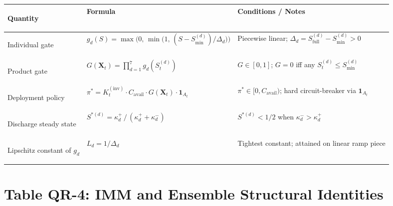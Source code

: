 \documentclass[12pt,openany]{book}
\numberwithin{equation}{chapter}
\theoremstyle{plain}
\theoremstyle{definition}
\theoremstyle{remark}
\renewcommand{\arraystretch}{1.2}
\def\mathcal#1{#1}%
\begin{document}
\begin{center}
\small
\renewcommand{\arraystretch}{1.40}
\begin{tabularx}{\linewidth}{@{}
  >{\bfseries\raggedright\arraybackslash}p{3.2cm}
  >{\raggedright\arraybackslash}p{4.6cm}
  >{\raggedright\arraybackslash}X
@{}}
\toprule
Quantity & Formula & Conditions / Notes \\
\midrule
Individual gate &
$g_d(\mathcal{S}) = \max\!\bigl(0,\,\min\!\bigl(1,\,(\mathcal{S}-\mathcal{S}_{\min}^{(d)})/\Delta_d\bigr)\bigr)$ &
Piecewise linear; $\Delta_d = \mathcal{S}_{\mathrm{full}}^{(d)}-\mathcal{S}_{\min}^{(d)}>0$ \\
Product gate &
$G(\mathbf{X}_t) = \prod_{d=1}^{7} g_d(\mathcal{S}_t^{(d)})$ &
$G\in[0,1]$; $G=0$ iff any $\mathcal{S}_t^{(d)}\leq\mathcal{S}_{\min}^{(d)}$ \\
Deployment policy &
$\pi^* = K_t^{(\mathrm{inv})}\cdot C_{\mathrm{avail}}\cdot G(\mathbf{X}_t)\cdot\mathbf{1}_{\mathcal{A}_t}$ &
$\pi^*\in[0,C_{\mathrm{avail}})$; hard circuit-breaker via $\mathbf{1}_{\mathcal{A}_t}$ \\
Discharge steady state &
$\mathcal{S}^{*(d)} = \kappa_d^+\,/\,(\kappa_d^++\kappa_d^-)$ &
$\mathcal{S}^{*(d)}<1/2$ when $\kappa_d^->\kappa_d^+$ \\
Lipschitz constant of $g_d$ &
$L_d = 1/\Delta_d$ &
Tightest constant; attained on linear ramp piece \\
\bottomrule
\end{tabularx}
\end{center}

\section*{Table QR-4: IMM and Ensemble Structural Identities}
\end{document}
